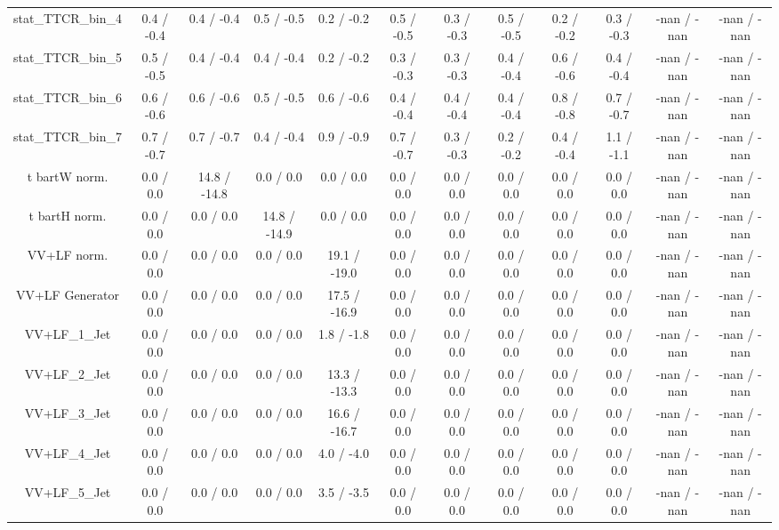 \begin{table}[htbp]
\begin{center}
\begin{tabular}{|c|c|c|c|c|c|c|c|c|c|c|c|}
 stat_TTCR_bin_4 & 0.4 / -0.4 & 0.4 / -0.4 & 0.5 / -0.5 & 0.2 / -0.2 & 0.5 / -0.5 & 0.3 / -0.3 & 0.5 / -0.5 & 0.2 / -0.2 & 0.3 / -0.3 & -nan / -nan & -nan / -nan \\ 
 stat_TTCR_bin_5 & 0.5 / -0.5 & 0.4 / -0.4 & 0.4 / -0.4 & 0.2 / -0.2 & 0.3 / -0.3 & 0.3 / -0.3 & 0.4 / -0.4 & 0.6 / -0.6 & 0.4 / -0.4 & -nan / -nan & -nan / -nan \\ 
 stat_TTCR_bin_6 & 0.6 / -0.6 & 0.6 / -0.6 & 0.5 / -0.5 & 0.6 / -0.6 & 0.4 / -0.4 & 0.4 / -0.4 & 0.4 / -0.4 & 0.8 / -0.8 & 0.7 / -0.7 & -nan / -nan & -nan / -nan \\ 
 stat_TTCR_bin_7 & 0.7 / -0.7 & 0.7 / -0.7 & 0.4 / -0.4 & 0.9 / -0.9 & 0.7 / -0.7 & 0.3 / -0.3 & 0.2 / -0.2 & 0.4 / -0.4 & 1.1 / -1.1 & -nan / -nan & -nan / -nan \\ 
  t bar{t}W norm. & 0.0 / 0.0 & 14.8 / -14.8 & 0.0 / 0.0 & 0.0 / 0.0 & 0.0 / 0.0 & 0.0 / 0.0 & 0.0 / 0.0 & 0.0 / 0.0 & 0.0 / 0.0 & -nan / -nan & -nan / -nan \\ 
  t bar{t}H norm. & 0.0 / 0.0 & 0.0 / 0.0 & 14.8 / -14.9 & 0.0 / 0.0 & 0.0 / 0.0 & 0.0 / 0.0 & 0.0 / 0.0 & 0.0 / 0.0 & 0.0 / 0.0 & -nan / -nan & -nan / -nan \\ 
  VV+LF norm. & 0.0 / 0.0 & 0.0 / 0.0 & 0.0 / 0.0 & 19.1 / -19.0 & 0.0 / 0.0 & 0.0 / 0.0 & 0.0 / 0.0 & 0.0 / 0.0 & 0.0 / 0.0 & -nan / -nan & -nan / -nan \\ 
  VV+LF Generator & 0.0 / 0.0 & 0.0 / 0.0 & 0.0 / 0.0 & 17.5 / -16.9 & 0.0 / 0.0 & 0.0 / 0.0 & 0.0 / 0.0 & 0.0 / 0.0 & 0.0 / 0.0 & -nan / -nan & -nan / -nan \\ 
  VV+LF_1_Jet & 0.0 / 0.0 & 0.0 / 0.0 & 0.0 / 0.0 & 1.8 / -1.8 & 0.0 / 0.0 & 0.0 / 0.0 & 0.0 / 0.0 & 0.0 / 0.0 & 0.0 / 0.0 & -nan / -nan & -nan / -nan \\ 
  VV+LF_2_Jet & 0.0 / 0.0 & 0.0 / 0.0 & 0.0 / 0.0 & 13.3 / -13.3 & 0.0 / 0.0 & 0.0 / 0.0 & 0.0 / 0.0 & 0.0 / 0.0 & 0.0 / 0.0 & -nan / -nan & -nan / -nan \\ 
  VV+LF_3_Jet & 0.0 / 0.0 & 0.0 / 0.0 & 0.0 / 0.0 & 16.6 / -16.7 & 0.0 / 0.0 & 0.0 / 0.0 & 0.0 / 0.0 & 0.0 / 0.0 & 0.0 / 0.0 & -nan / -nan & -nan / -nan \\ 
  VV+LF_4_Jet & 0.0 / 0.0 & 0.0 / 0.0 & 0.0 / 0.0 & 4.0 / -4.0 & 0.0 / 0.0 & 0.0 / 0.0 & 0.0 / 0.0 & 0.0 / 0.0 & 0.0 / 0.0 & -nan / -nan & -nan / -nan \\ 
  VV+LF_5_Jet & 0.0 / 0.0 & 0.0 / 0.0 & 0.0 / 0.0 & 3.5 / -3.5 & 0.0 / 0.0 & 0.0 / 0.0 & 0.0 / 0.0 & 0.0 / 0.0 & 0.0 / 0.0 & -nan / -nan & -nan / -nan \\ 

\end{tabular}
\end{center}
\end{table}

